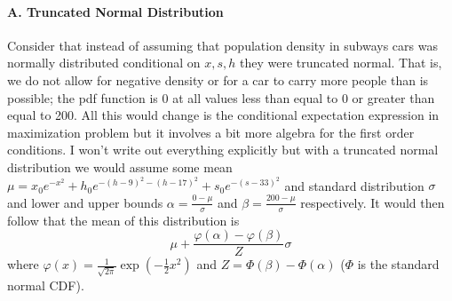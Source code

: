 \documentclass[11pt]{article}
\begin{document}
\hypertarget{a.-truncated-normal-distribution}{%
\paragraph{A. Truncated Normal
Distribution}\label{a.-truncated-normal-distribution}}

Consider that instead of assuming that population density in subways
cars was normally distributed conditional on \(x, s, h\) they were
truncated normal. That is, we do not allow for negative density or for a
car to carry more people than is possible; the pdf function is 0 at all
values less than equal to 0 or greater than equal to 200. All this would
change is the conditional expectation expression in maximization problem
but it involves a bit more algebra for the first order conditions. I
won't write out everything explicitly but with a truncated normal
distribution we would assume some mean
\(\mu =x_0e^{-x^2} + h_0e^{-(h-9)^2 - (h-17)^2} + s_0e^{-(s-33)^2}\) and
standard distribution \(\sigma\) and lower and upper bounds
\(\alpha = \frac{0 - \mu}{\sigma}\) and
\(\beta = \frac{200 - \mu}{\sigma}\) respectively. It would then follow
that the mean of this distribution is
\[\mu + \frac{\varphi(\alpha) - \varphi(\beta)}{Z}\sigma\] where
\(\varphi(x) = \frac{1}{\sqrt{2\pi}}\exp\left(-\frac{1}{2}x^2\right)\)
and \(Z = \Phi(\beta) - \Phi(\alpha)\) (\(\Phi\) is the standard normal
CDF).


    
    
    
\end{document}
